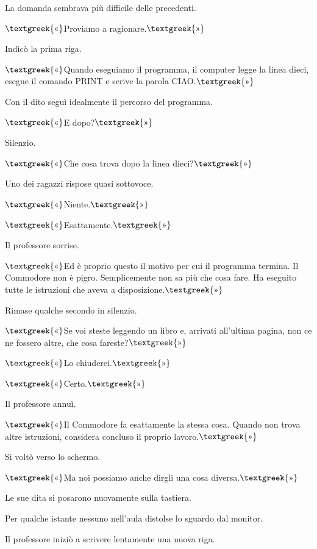\documentclass{article}
\begin{document}
La domanda sembrava più difficile delle precedenti.

$\text{\textgreek{«}}$Proviamo a ragionare.$\text{\textgreek{»}}$

Indicò la prima riga.

$\text{\textgreek{«}}$Quando eseguiamo il programma, il computer legge la linea dieci, esegue il comando PRINT e scrive
la parola {\textquotedbl}CIAO{\textquotedbl}.$\text{\textgreek{»}}$

Con il dito seguì idealmente il percorso del programma.

$\text{\textgreek{«}}$E dopo?$\text{\textgreek{»}}$

Silenzio.

$\text{\textgreek{«}}$Che cosa trova dopo la linea dieci?$\text{\textgreek{»}}$

Uno dei ragazzi rispose quasi sottovoce.

$\text{\textgreek{«}}$Niente.$\text{\textgreek{»}}$

$\text{\textgreek{«}}$Esattamente.$\text{\textgreek{»}}$

Il professore sorrise.

$\text{\textgreek{«}}$Ed è proprio questo il motivo per cui il programma termina. Il Commodore non è pigro.
Semplicemente non sa più che cosa fare. Ha eseguito tutte le istruzioni che aveva a disposizione.$\text{\textgreek{»}}$

Rimase qualche secondo in silenzio.

$\text{\textgreek{«}}$Se voi steste leggendo un libro e, arrivati all'ultima pagina, non ce ne fossero altre, che cosa
fareste?$\text{\textgreek{»}}$

$\text{\textgreek{«}}$Lo chiuderei.$\text{\textgreek{»}}$

$\text{\textgreek{«}}$Certo.$\text{\textgreek{»}}$

Il professore annuì.

$\text{\textgreek{«}}$Il Commodore fa esattamente la stessa cosa. Quando non trova altre istruzioni, considera concluso
il proprio lavoro.$\text{\textgreek{»}}$

Si voltò verso lo schermo.

$\text{\textgreek{«}}$Ma noi possiamo anche dirgli una cosa diversa.$\text{\textgreek{»}}$

Le sue dita si posarono nuovamente sulla tastiera.

Per qualche istante nessuno nell'aula distolse lo sguardo dal monitor.

Il professore iniziò a scrivere lentamente una nuova riga.
\end{document}

